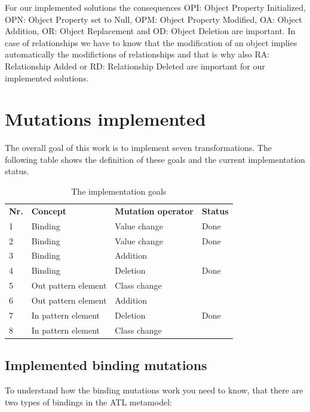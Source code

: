 \documentclass{llncs}
\begin{document}
For our implemented solutions the consequences OPI: Object Property
Initialized, OPN: Object Property set to Null, OPM:
Object Property Modified, OA: Object
Addition, OR: Object Replacement and OD: Object Deletion are important. In case
of relationships we have to know that the modification of an object implies
automatically the modifictions of relationships and that is why also RA:
Relationship Added or RD: Relationship Deleted are important for our implemented
solutions.

\section{Mutations implemented}

The overall goal of this work is to implement seven transformations. The following table shows the definition of these goals and the current implementation status.
\begin{table}[h]
\begin{tabular}{llll}
\textbf{Nr.} & \textbf{Concept}    & \textbf{Mutation operator} & \textbf{Status} \\
1            & Binding             & Value change               & Done            \\
2            & Binding             & Value change               & Done            \\
3            & Binding             & Addition                   &                 \\
4            & Binding             & Deletion                   & Done            \\
5            & Out pattern element & Class change               &                 \\
6            & Out pattern element & Addition                   &                 \\
7            & In pattern element  & Deletion                   & Done            \\
8            & In pattern element  & Class change               &                
\label{tbl:goals}
\end{tabular}
\caption{The implementation goals}
\end{table}

\subsection{Implemented binding mutations}

To understand how the binding mutations work you need to know, that there are two types of bindings in the ATL metamodel:
\end{document}
